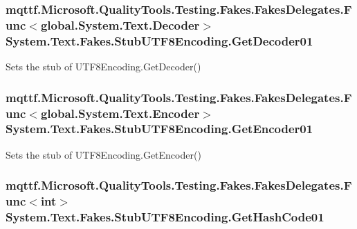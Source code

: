 \hypertarget{class_system_1_1_text_1_1_fakes_1_1_stub_u_t_f8_encoding_aa01ea553341239e35e46fe19e0023447}{
\subsubsection[{Get\-Decoder01}]{\setlength{\rightskip}{0pt plus 5cm}mqttf.\-Microsoft.\-Quality\-Tools.\-Testing.\-Fakes.\-Fakes\-Delegates.\-Func$<$global.\-System.\-Text.\-Decoder$>$ System.\-Text.\-Fakes.\-Stub\-U\-T\-F8\-Encoding.\-Get\-Decoder01}}\label{class_system_1_1_text_1_1_fakes_1_1_stub_u_t_f8_encoding_aa01ea553341239e35e46fe19e0023447}


Sets the stub of U\-T\-F8\-Encoding.\-Get\-Decoder()

\hypertarget{class_system_1_1_text_1_1_fakes_1_1_stub_u_t_f8_encoding_aec7e3441cce06fc48948a286916d5e53}{
\subsubsection[{Get\-Encoder01}]{\setlength{\rightskip}{0pt plus 5cm}mqttf.\-Microsoft.\-Quality\-Tools.\-Testing.\-Fakes.\-Fakes\-Delegates.\-Func$<$global.\-System.\-Text.\-Encoder$>$ System.\-Text.\-Fakes.\-Stub\-U\-T\-F8\-Encoding.\-Get\-Encoder01}}\label{class_system_1_1_text_1_1_fakes_1_1_stub_u_t_f8_encoding_aec7e3441cce06fc48948a286916d5e53}


Sets the stub of U\-T\-F8\-Encoding.\-Get\-Encoder()

\hypertarget{class_system_1_1_text_1_1_fakes_1_1_stub_u_t_f8_encoding_a985c103cbfaecc36e1edaa7d7f546d91}{
\subsubsection[{Get\-Hash\-Code01}]{\setlength{\rightskip}{0pt plus 5cm}mqttf.\-Microsoft.\-Quality\-Tools.\-Testing.\-Fakes.\-Fakes\-Delegates.\-Func$<$int$>$ System.\-Text.\-Fakes.\-Stub\-U\-T\-F8\-Encoding.\-Get\-Hash\-Code01}}\label{class_system_1_1_text_1_1_fakes_1_1_stub_u_t_f8_encoding_a985c103cbfaecc36e1edaa7d7f546d91}


